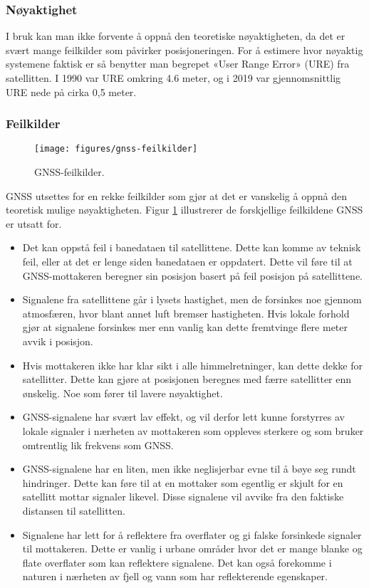 \subsubsection{Nøyaktighet}
I bruk kan man ikke forvente å oppnå den teoretiske nøyaktigheten, da det er svært mange feilkilder som påvirker posisjoneringen. 
For å estimere hvor nøyaktig systemene faktisk er så benytter man begrepet «User Range Error» (URE) fra satellitten. 
I 1990 var URE omkring 4.6 meter, og i 2019 var gjennomsnittlig URE nede på cirka 0,5 meter. \parencite{ForsellGNSS}

\subsubsection{Feilkilder}

\begin{figure}[htp]
    \centering
    \texttt{[image: figures/gnss-feilkilder]}
    \caption{GNSS-feilkilder.\parencite{NorskRomsenter}}
    \label{fig:gnss-feilkilder}
\end{figure}

GNSS utsettes for en rekke feilkilder som gjør at det er vanskelig å oppnå den teoretisk mulige nøyaktigheten. 
Figur \ref{fig:gnss-feilkilder} illustrerer de forskjellige feilkildene GNSS er utsatt for.

\begin{itemize}
\item Det kan oppstå feil i banedataen til satellittene. Dette kan komme av teknisk feil, eller at det er lenge siden banedataen er oppdatert. Dette vil føre til at GNSS-mottakeren beregner sin posisjon basert på feil posisjon på satellittene.
\item Signalene fra satellittene går i lysets hastighet, men de forsinkes noe gjennom atmosfæren, hvor blant annet luft bremser hastigheten. Hvis lokale forhold gjør at signalene forsinkes mer enn vanlig kan dette fremtvinge flere meter avvik i posisjon.
\item Hvis mottakeren ikke har klar sikt i alle himmelretninger, kan dette dekke for satellitter. Dette kan gjøre at posisjonen beregnes med færre satellitter enn ønskelig. Noe som fører til lavere nøyaktighet.
\item GNSS-signalene har svært lav effekt, og vil derfor lett kunne forstyrres av lokale signaler i nærheten av mottakeren som oppleves sterkere og som bruker omtrentlig lik frekvens som GNSS.
\item GNSS-signalene har en liten, men ikke neglisjerbar evne til å bøye seg rundt hindringer. Dette kan føre til at en mottaker som egentlig er skjult for en satellitt mottar signaler likevel. Disse signalene vil avvike fra den faktiske distansen til satellitten.
\item Signalene har lett for å reflektere fra overflater og gi falske forsinkede signaler til mottakeren. Dette er vanlig i urbane områder hvor det er mange blanke og flate overflater som kan reflektere signalene. Det kan også forekomme i naturen i nærheten av fjell og vann som har reflekterende egenskaper. \parencite{NorskRomsenter} 
\end{itemize}

